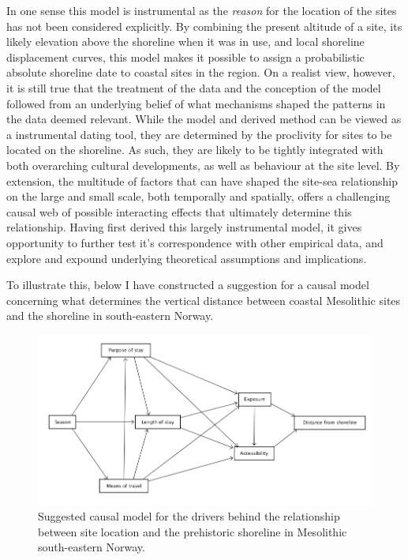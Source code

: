 \documentclass[
  12pt,
  a4paper,
  oneside]{book}
\begin{document}
In one sense this model is instrumental as the \emph{reason} for the location of the sites has not been considered explicitly. By combining the present altitude of a site, its likely elevation above the shoreline when it was in use, and local shoreline displacement curves, this model makes it possible to assign a probabilistic absolute shoreline date to coastal sites in the region. On a realist view, however, it is still true that the treatment of the data and the conception of the model followed from an underlying belief of what mechanisms shaped the patterns in the data deemed relevant. While the model and derived method can be viewed as a instrumental dating tool, they are determined by the proclivity for sites to be located on the shoreline. As such, they are likely to be tightly integrated with both overarching cultural developments, as well as behaviour at the site level. By extension, the multitude of factors that can have shaped the site-sea relationship on the large and small scale, both temporally and spatially, offers a challenging causal web of possible interacting effects that ultimately determine this relationship. Having first derived this largely instrumental model, it gives opportunity to further test it's correspondence with other empirical data, and explore and expound underlying theoretical assumptions and implications.

To illustrate this, below I have constructed a suggestion for a causal model concerning what determines the vertical distance between coastal Mesolithic sites and the shoreline in south-eastern Norway.

\begin{figure}

{\centering \includegraphics[width=1\linewidth]{figures/dagitty_p1} 

}

\caption{Suggested causal model for the drivers behind the relationship between site location and the prehistoric shoreline in Mesolithic south-eastern Norway.}\label{fig:d1}
\end{figure}
\end{document}
